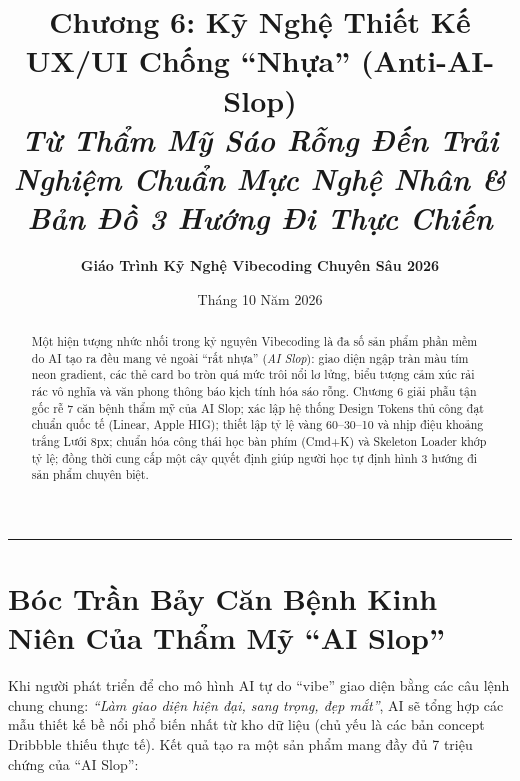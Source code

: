 \documentclass[a4paper,11pt]{article}
\title{\textbf{Chương 6: Kỹ Nghệ Thiết Kế UX/UI Chống ``Nhựa'' (Anti-AI-Slop)}\\[0.3em]
\large\textit{Từ Thẩm Mỹ Sáo Rỗng Đến Trải Nghiệm Chuẩn Mực Nghệ Nhân \& Bản Đồ 3 Hướng Đi Thực Chiến}}
\author{\textbf{Giáo Trình Kỹ Nghệ Vibecoding Chuyên Sâu 2026}}
\date{Tháng 10 Năm 2026}
\begin{document}
\maketitle

\begin{abstract}
Một hiện tượng nhức nhối trong kỷ nguyên Vibecoding là đa số sản phẩm phần mềm do AI tạo ra đều mang vẻ ngoài ``rất nhựa'' (\textit{AI Slop}): giao diện ngập tràn màu tím neon gradient, các thẻ card bo tròn quá mức trôi nổi lơ lửng, biểu tượng cảm xúc rải rác vô nghĩa và văn phong thông báo kịch tính hóa sáo rỗng. Chương 6 giải phẫu tận gốc rễ 7 căn bệnh thẩm mỹ của AI Slop; xác lập hệ thống Design Tokens thủ công đạt chuẩn quốc tế (Linear, Apple HIG); thiết lập tỷ lệ vàng 60--30--10 và nhịp điệu khoảng trắng Lưới 8px; chuẩn hóa công thái học bàn phím (Cmd+K) và Skeleton Loader khớp tỷ lệ; đồng thời cung cấp một cây quyết định giúp người học tự định hình 3 hướng đi sản phẩm chuyên biệt.
\end{abstract}

\vspace{1em}
\rule{\textwidth}{0.4pt}

\section{Bóc Trần Bảy Căn Bệnh Kinh Niên Của Thẩm Mỹ ``AI Slop''}

Khi người phát triển để cho mô hình AI tự do ``vibe'' giao diện bằng các câu lệnh chung chung: \textit{``Làm giao diện hiện đại, sang trọng, đẹp mắt''}, AI sẽ tổng hợp các mẫu thiết kế bề nổi phổ biến nhất từ kho dữ liệu (chủ yếu là các bản concept Dribbble thiếu thực tế). Kết quả tạo ra một sản phẩm mang đầy đủ 7 triệu chứng của ``AI Slop'':
\end{document}
